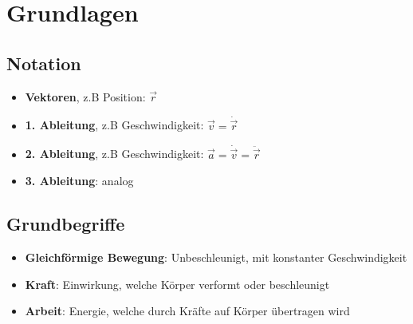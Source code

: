 \section{Grundlagen}%
\label{grnd:sec:grundlagen}

\subsection{Notation}%
\label{grnd:sub:Notation}

\begin{itemize}
	\item \textbf{Vektoren}, z.B Position: $\vec{r}$
	\item \textbf{1. Ableitung}, z.B Geschwindigkeit: $\vec{v} = \dot{\vec{r}}$
	\item \textbf{2. Ableitung}, z.B Geschwindigkeit: $\vec{a} = \dot{\vec{v}} = \ddot{\vec{r}}$
	\item \textbf{3. Ableitung}: analog
\end{itemize}

\subsection{Grundbegriffe}%
\label{grnd:sub:grundbegriffe}

\begin{itemize}
	\item \textbf{Gleichförmige Bewegung}: Unbeschleunigt, mit konstanter Geschwindigkeit
	\item \textbf{Kraft}: Einwirkung, welche Körper verformt oder beschleunigt
	\item \textbf{Arbeit}: Energie, welche durch Kräfte auf Körper übertragen wird
\end{itemize}